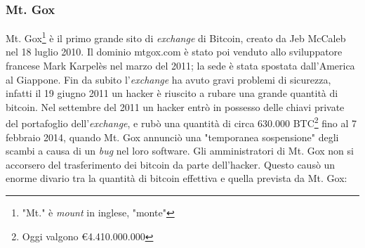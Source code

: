 \documentclass {article}
\begin{document}
\subsubsection {Mt. Gox}

Mt. Gox\footnote{"Mt." è \textit{mount} in inglese, "monte"} è il primo grande sito di \textit{exchange} di Bitcoin, creato da Jeb McCaleb nel 18 luglio 2010.
Il dominio mtgox.com è stato poi venduto allo sviluppatore francese Mark Karpelès nel marzo del 2011; la sede è stata spostata dall'America al Giappone.
Fin da subito l'\textit{exchange} ha avuto gravi problemi di sicurezza, infatti il 19 giugno 2011 un hacker è riuscito a rubare una grande quantità di bitcoin.
Nel settembre del 2011 un hacker entrò in possesso delle chiavi private del portafoglio dell'\textit{exchange}, e rubò una quantità di circa 630.000 BTC\footnote{Oggi valgono \euro{4.410.000.000}} fino al 7 febbraio 2014, quando Mt. Gox annunciò una "temporanea sospensione" degli scambi a causa di un \textit{bug} nel loro software.
Gli amministratori di Mt. Gox non si accorsero del trasferimento dei bitcoin da parte dell'hacker.
Questo causò un enorme divario tra la quantità di bitcoin effettiva e quella prevista da Mt. Gox:
\end{document}
